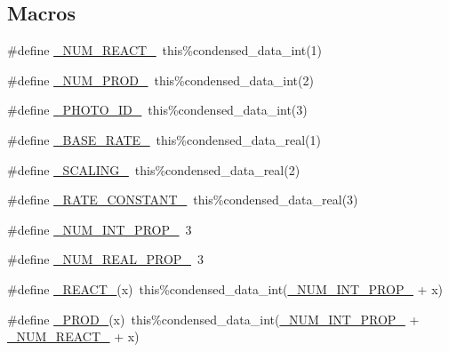 \subsection*{Macros}
\begin{DoxyCompactItemize}
\item 
\#define \mbox{\hyperlink{rxn__photolysis_8_f90_aee1fee52189b85b8a55162815b7eb2ab}{\+\_\+\+N\+U\+M\+\_\+\+R\+E\+A\+C\+T\+\_\+}}~this\%condensed\+\_\+data\+\_\+int(1)
\item 
\#define \mbox{\hyperlink{rxn__photolysis_8_f90_a0ab2d7e00e334b5c52335f26ef6025e8}{\+\_\+\+N\+U\+M\+\_\+\+P\+R\+O\+D\+\_\+}}~this\%condensed\+\_\+data\+\_\+int(2)
\item 
\#define \mbox{\hyperlink{rxn__photolysis_8_f90_a80d1a68775f4bf39da2f43f9ab9cc8c7}{\+\_\+\+P\+H\+O\+T\+O\+\_\+\+I\+D\+\_\+}}~this\%condensed\+\_\+data\+\_\+int(3)
\item 
\#define \mbox{\hyperlink{rxn__photolysis_8_f90_a37208659695f932d38e7ff0854b195da}{\+\_\+\+B\+A\+S\+E\+\_\+\+R\+A\+T\+E\+\_\+}}~this\%condensed\+\_\+data\+\_\+real(1)
\item 
\#define \mbox{\hyperlink{rxn__photolysis_8_f90_a44b5bdc8cf91427e717c13d7c925db84}{\+\_\+\+S\+C\+A\+L\+I\+N\+G\+\_\+}}~this\%condensed\+\_\+data\+\_\+real(2)
\item 
\#define \mbox{\hyperlink{rxn__photolysis_8_f90_a90fa57a01e99ca76df9ef2ac521667ec}{\+\_\+\+R\+A\+T\+E\+\_\+\+C\+O\+N\+S\+T\+A\+N\+T\+\_\+}}~this\%condensed\+\_\+data\+\_\+real(3)
\item 
\#define \mbox{\hyperlink{rxn__photolysis_8_f90_a54f7194dc6a244f7eb7a78f88b3362ba}{\+\_\+\+N\+U\+M\+\_\+\+I\+N\+T\+\_\+\+P\+R\+O\+P\+\_\+}}~3
\item 
\#define \mbox{\hyperlink{rxn__photolysis_8_f90_a242fac7fe42c0d62936c65735dc023a6}{\+\_\+\+N\+U\+M\+\_\+\+R\+E\+A\+L\+\_\+\+P\+R\+O\+P\+\_\+}}~3
\item 
\#define \mbox{\hyperlink{rxn__photolysis_8_f90_a2465fb6c1cce932a0bb29dac2975ee64}{\+\_\+\+R\+E\+A\+C\+T\+\_\+}}(x)~this\%condensed\+\_\+data\+\_\+int(\mbox{\hyperlink{sub__model___u_n_i_f_a_c_8_f90_a54f7194dc6a244f7eb7a78f88b3362ba}{\+\_\+\+N\+U\+M\+\_\+\+I\+N\+T\+\_\+\+P\+R\+O\+P\+\_\+}} + x)
\item 
\#define \mbox{\hyperlink{rxn__photolysis_8_f90_ad730666d44e45e220232510d9e15ec79}{\+\_\+\+P\+R\+O\+D\+\_\+}}(x)~this\%condensed\+\_\+data\+\_\+int(\mbox{\hyperlink{sub__model___u_n_i_f_a_c_8_f90_a54f7194dc6a244f7eb7a78f88b3362ba}{\+\_\+\+N\+U\+M\+\_\+\+I\+N\+T\+\_\+\+P\+R\+O\+P\+\_\+}} + \mbox{\hyperlink{rxn__troe_8_f90_aee1fee52189b85b8a55162815b7eb2ab}{\+\_\+\+N\+U\+M\+\_\+\+R\+E\+A\+C\+T\+\_\+}} + x)

\end{DoxyCompactItemize}
